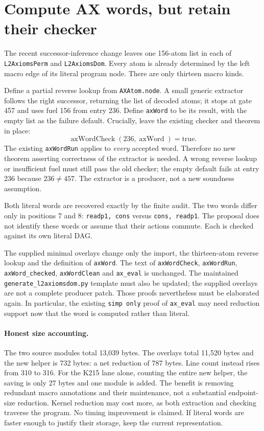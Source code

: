 \documentclass[11pt]{article}
\begin{document}
\section{Compute AX words, but retain their checker}\label{sec:ax}
The recent successor-inference change leaves one 156-atom list in each of \texttt{L2AxiomsPerm} and \texttt{L2AxiomsDom}. Every atom is already determined by the left macro edge of its literal program node. There are only thirteen macro kinds.

Define a partial reverse lookup from \texttt{AXAtom.node}. A small generic extractor follows the right successor, returning the list of decoded atoms; it stops at gate 457 and uses fuel 156 from entry 236. Define \texttt{axWord} to be its result, with the empty list as the failure default. Crucially, leave the existing checker and theorem in place:
\[
\operatorname{axWordCheck}(236,\operatorname{axWord})=\mathrm{true}.
\]
The existing \texttt{axWordRun} applies to \emph{every} accepted word. Therefore no new theorem asserting correctness of the extractor is needed. A wrong reverse lookup or insufficient fuel must still pass the old checker; the empty default fails at entry 236 because $236\ne457$. The extractor is a producer, not a new soundness assumption.

Both literal words are recovered exactly by the finite audit. The two words differ only in positions 7 and 8: \texttt{readp1, cons} versus \texttt{cons, readp1}. The proposal does not identify these words or assume that their actions commute. Each is checked against its own literal DAG.

The supplied minimal overlays change only the import, the thirteen-atom reverse lookup and the definition of \texttt{axWord}. The text of \texttt{axWordCheck}, \texttt{axWordRun}, \texttt{axWord\_checked}, \texttt{axWordClean} and \texttt{ax\_eval} is unchanged. The maintained \texttt{generate\_l2axiomsdom.py} template must also be updated; the supplied overlays are not a complete producer patch. Those proofs nevertheless must be elaborated again. In particular, the existing \texttt{simp only} proof of \texttt{ax\_eval} may need reduction support now that the word is computed rather than literal.

\paragraph{Honest size accounting.}
The two source modules total 13,039 bytes. The overlays total 11,520 bytes and the new helper is 732 bytes: a net reduction of 787 bytes. Line count instead rises from 310 to 316. For the K215 lane alone, counting the entire new helper, the saving is only 27 bytes and one module is added. The benefit is removing redundant macro annotations and their maintenance, not a substantial endpoint-size reduction. Kernel reduction may cost more, as both extraction and checking traverse the program. No timing improvement is claimed. If literal words are faster enough to justify their storage, keep the current representation.
\end{document}
